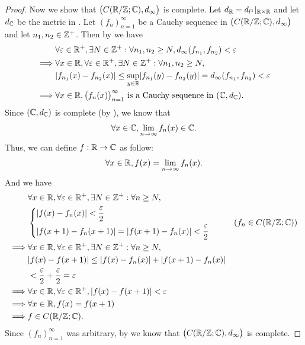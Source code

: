 \begin{proof}
  Now we show that \(\big(C(\mathbb{R} / \mathbb{Z} ; \mathbb{C}), d_\infty\big)\) is complete.
  Let \(d_{\mathbb{R}} = d_{l^1}|_{\mathbb{R} \times \mathbb{R}}\) and let \(d_{\mathbb{C}}\) be the metric in .
  Let \((f_n)_{n = 1}^\infty\) be a Cauchy sequence in \(\big(C(\mathbb{R} / \mathbb{Z} ; \mathbb{C}), d_\infty\big)\) and let \(n_1, n_2 \in \mathbb{Z}^+\).
  Then by  we have
  \begin{align*}
             & \forall \varepsilon \in \R^+, \exists N \in \Z^+ : \forall n_1, n_2 \geq N, d_\infty(f_{n_1}, f_{n_2}) < \varepsilon        \\
    \implies & \forall x \in \R, \forall \varepsilon \in \R^+, \exists N \in \Z^+ : \forall n_1, n_2 \geq N,                               \\
             & \abs{f_{n_1}(x) - f_{n_2}(x)} \leq \sup_{y \in \R} \abs{f_{n_1}(y) - f_{n_2}(y)} = d_\infty(f_{n_1}, f_{n_2}) < \varepsilon \\
    \implies & \forall x \in \R, \big(f_n(x)\big)_{n = 1}^\infty \text{ is a Cauchy sequence in } (\C, d_{\C}).
  \end{align*}
  Since \((\mathbb{C}, d_{\mathbb{C}})\) is complete (by ), we know that
  \[
    \forall x \in \mathbb{C}, \lim_{n \to \infty} f_n(x) \in \mathbb{C}.
  \]
  Thus, we can define \(f : \mathbb{R} \to \mathbb{C}\) as follow:
  \[
    \forall x \in \mathbb{R}, f(x) = \lim_{n \to \infty} f_n(x).
  \]
  And we have
  \begin{align*}
             & \forall x \in \R, \forall \varepsilon \in \R^+, \exists N \in \Z^+ : \forall n \geq N, \\
             & \begin{dcases}
                 \abs{f(x) - f_n(x)} < \dfrac{\varepsilon}{2} \\
                 \abs{f(x + 1) - f_n(x + 1)} = \abs{f(x + 1) - f_n(x)} < \dfrac{\varepsilon}{2}
               \end{dcases}         & (f_n \in C(\R / \Z ; \C))          \\
    \implies & \forall x \in \R, \forall \varepsilon \in \R^+, \exists N \in \Z^+ : \forall n \geq N, \\
             & \abs{f(x) - f(x + 1)} \leq \abs{f(x) - f_n(x)} + \abs{f(x + 1) - f_n(x)}               \\
             & < \dfrac{\varepsilon}{2} + \dfrac{\varepsilon}{2} = \varepsilon                        \\
    \implies & \forall x \in \R, \forall \varepsilon \in \R^+, \abs{f(x) - f(x + 1)} < \varepsilon    \\
    \implies & \forall x \in \R, f(x) = f(x + 1)                                                      \\
    \implies & f \in C(\R / \Z ; \C).
  \end{align*}
  Since \((f_n)_{n = 1}^\infty\) was arbitrary, by  we know that \(\big(C(\mathbb{R} / \mathbb{Z} ; \mathbb{C}), d_\infty\big)\) is complete.
\end{proof}
